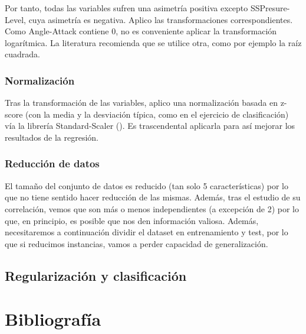 Por tanto, todas las variables sufren una asimetría positiva excepto SSPresure-Level, cuya asimetría es negativa. Aplico las transformaciones correspondientes. Como Angle-Attack contiene 0, no es conveniente aplicar la transformación logarítmica. La literatura recomienda que se utilice otra, como por ejemplo la raíz cuadrada.

\subsubsection{Normalización}

Tras la transformación de las variables, aplico una normalización basada en z-score (con la media y la desviación típica, como en el ejercicio de clasificación) vía la librería Standard-Scaler (\cite{st-sc}). Es trascendental aplicarla para así mejorar los resultados de la regresión.


\subsubsection{Reducción de datos}

El tamaño del conjunto de datos es reducido (tan solo 5 características) por lo que no tiene sentido hacer reducción de las mismas. Además, tras el estudio de su correlación, vemos que son más o menos independientes (a excepción de 2) por lo que, en principio, es posible que nos den información valiosa. Además, necesitaremos a continuación dividir el dataset en entrenamiento y test, por lo que si reducimos instancias, vamos a perder capacidad de generalización.

\subsection{Regularización y clasificación}
\newpage
\section{Bibliografía}




